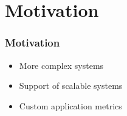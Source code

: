 \section{Motivation}
\begin{frame}
  \frametitle{Motivation} 
 
  \begin{itemize}
   \item<1-> More complex systems \faThumbsODown
   \item<1-> Support of scalable systems \faMehO
   \item<1-> Custom application metrics \faThumbsOUp
  \end{itemize}
  
\end{frame}
